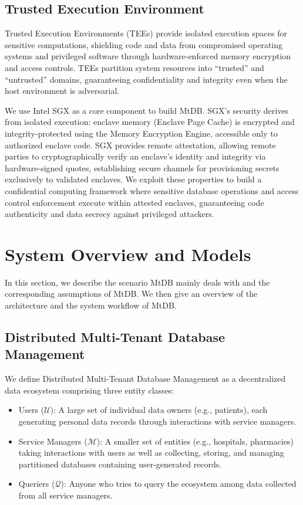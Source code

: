 \documentclass[conference]{IEEEtran}
\newcommand{\wenyi}[1]{ {\color{blue}{#1}}}
\newcommand{\ours}{\xspace MtDB\xspace}
\begin{document}
\subsection{Trusted Execution Environment}
Trusted Execution Environments (TEEs) provide isolated execution spaces for sensitive computations, shielding code and data from compromised operating systems and privileged software through hardware-enforced memory encryption and access controls. TEEs partition system resources into ``trusted'' and ``untrusted'' domains, guaranteeing confidentiality and integrity even when the host environment is adversarial.

We use Intel SGX as a core component to build \ours. SGX's security derives from isolated execution: enclave memory (Enclave Page Cache) is encrypted and integrity-protected using the Memory Encryption Engine, accessible only to authorized enclave code. SGX provides remote attestation, allowing remote parties to cryptographically verify an enclave's identity and integrity via hardware-signed quotes, establishing secure channels for provisioning secrets exclusively to validated enclaves. We exploit these properties to build a confidential computing framework where sensitive database operations and access control enforcement execute within attested enclaves, guaranteeing code authenticity and data secrecy against privileged attackers.

\section{System Overview and Models}
In this section, we describe the scenario \ours mainly deals with and the corresponding assumptions of \ours. We then give an overview of the architecture and the system workflow of \ours. 
\subsection{Distributed Multi-Tenant Database Management}
We define Distributed Multi-Tenant Database Management as a decentralized data ecosystem comprising three entity classes:
\begin{itemize}
    \item Users ($\mathcal{U}$): A large set of individual data owners (e.g., patients), each generating personal data records through interactions with service managers.
    \item Service Managers ($\mathcal{M}$): A smaller set of entities (e.g., hospitals, pharmacies) taking interactions with users as well as collecting, storing, and managing partitioned databases containing user-generated records.
    \item Queriers ($\mathcal{Q}$): Anyone who tries to query the ecosystem among data collected from all service managers.
\end{itemize}
\end{document}
